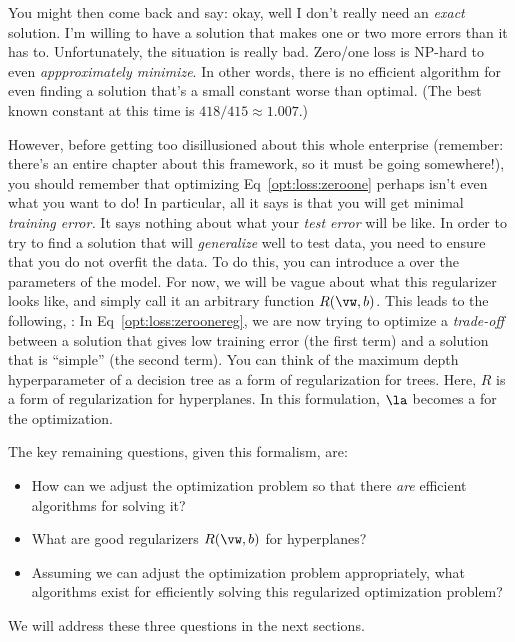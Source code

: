 You might then come back and say: okay, well I don't really need an
\emph{exact} solution.  I'm willing to have a solution that makes one
or two more errors than it has to.  Unfortunately, the situation is
really bad.  Zero/one loss is NP-hard to even \emph{appproximately
  minimize}.  In other words, there is no efficient algorithm for even
finding a solution that's a small constant worse than optimal.  (The
best known constant at this time is $418/415 \approx 1.007$.)

However, before getting too disillusioned about this whole enterprise
(remember: there's an entire chapter about this framework, so it must
be going somewhere!), you should remember that optimizing
Eq~\eqref{opt:loss:zeroone} perhaps isn't even what you want to do!
In particular, all it says is that you will get minimal \emph{training
  error.}  It says nothing about what your \emph{test error} will be
like.  In order to try to find a solution that will \emph{generalize}
well to test data, you need to ensure that you do not overfit the
data.  To do this, you can introduce a  over the
parameters of the model.  For now, we will be vague about what this
regularizer looks like, and simply call it an arbitrary function
$R(\vw,b)$.  This leads to the following, :
%
%
In Eq~\eqref{opt:loss:zeroonereg}, we are now trying to optimize a
\emph{trade-off} between a solution that gives low training error (the
first term) and a solution that is ``simple'' (the second term).  You
can think of the maximum depth hyperparameter of a decision tree as a
form of regularization for trees.  Here, $R$ is a form of
regularization for hyperplanes.  In this formulation, $\la$ becomes a
 for the optimization.


The key remaining questions, given this formalism, are:
\begin{itemize}
\item How can we adjust the optimization problem so that there
  \emph{are} efficient algorithms for solving it?
\item What are good regularizers $R(\vw,b)$ for hyperplanes?
\item Assuming we can adjust the optimization problem appropriately,
  what algorithms exist for efficiently solving this regularized
  optimization problem?
\end{itemize}
We will address these three questions in the next sections.

